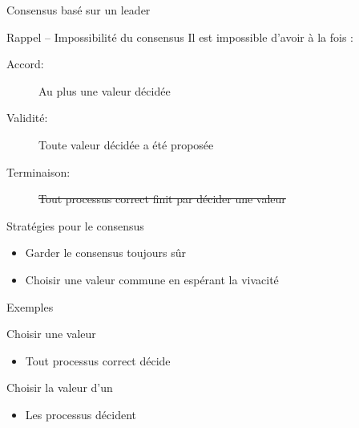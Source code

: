 
\begingroup

\newcommand{\Abort}{\textsc{Abort}}
\newcommand{\Adopt}{\textsc{Adopt}}
\newcommand{\Commit}{\textsc{Commit}}

\begin{frame}{Consensus basé sur un leader}

  \begin{alertblock}{Rappel -- Impossibilité du consensus}
    Il est impossible d'avoir à la fois :
    \begin{description}
    \item[Accord: ] Au plus une valeur décidée
    \item[Validité: ] Toute valeur décidée a été proposée
    \item[Terminaison: ] \alert{\sout{{\color{black} Tout processus correct finit par décider une valeur}}}
    \end{description}
  \end{alertblock}
    
  \begin{block}{Stratégies pour le consensus}
    \begin{itemize}
    \item Garder le consensus toujours sûr
    \item Choisir une valeur commune en espérant la vivacité
    \end{itemize}
  \end{block}
   
  \begin{exampleblock}{Exemples}
    \begin{description}[Ben-Or :]
    \item[Ben-Or :] Choisir une valeur 
      \begin{itemize}
      \item Tout processus correct décide 
      \end{itemize}
    \item[Paxos :] Choisir la valeur d'un  
      \begin{itemize}
      \item Les processus décident 
      \end{itemize}
    \end{description}
  \end{exampleblock}


\end{frame}
